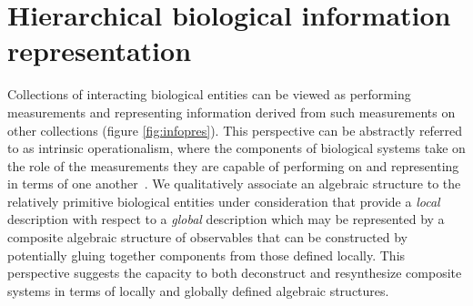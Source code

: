 \documentclass[aps,twocolumn]{revtex4-1}
\begin{document}

\section{Hierarchical biological information representation}
Collections of interacting biological entities can be viewed as performing measurements and representing information derived from such measurements on other collections (figure \ref{fig:infopres}). This perspective can be abstractly referred to as intrinsic operationalism, where the components of biological systems take on the role of the measurements they are capable of performing on and representing in terms of one another~\cite{Wolkenhauer2007,Harmer2010,Houle2011}. We qualitatively associate an algebraic structure to the relatively primitive biological entities under consideration that provide a {\it local} description with respect to a {\it global} description which may be represented by a composite algebraic structure of observables that can be constructed by potentially gluing together components from those defined locally. This perspective suggests the capacity to both deconstruct and resynthesize composite systems in terms of locally and globally defined algebraic structures.
\end{document}
